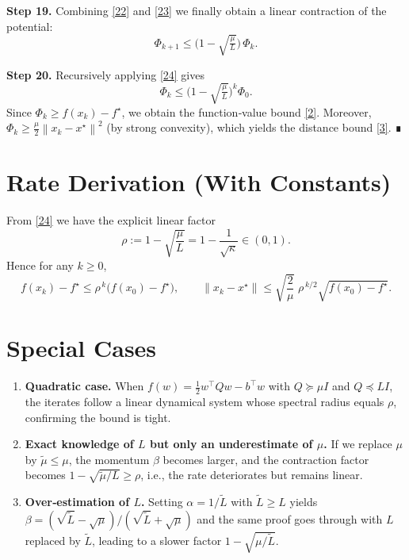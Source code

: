 \documentclass[11pt]{article}
\newcommand{\norm}[1]{\left\|#1\right\|}
\begin{document}
\noindent\textbf{Step 19.} Combining \eqref{22} and \eqref{23} we finally obtain a linear contraction of the potential:
\[
\Phi_{k+1}\le \bigl(1-\sqrt{\tfrac{\mu}{L}}\bigr)\,\Phi_k .
\tag{24}
\]

\noindent\textbf{Step 20.} Recursively applying \eqref{24} gives
\[
\Phi_k \le \bigl(1-\sqrt{\tfrac{\mu}{L}}\bigr)^{k}\Phi_0 .
\]
Since $\Phi_k\ge f(x_k)-f^\star$, we obtain the function‑value bound \eqref{2}. Moreover, $\Phi_k\ge \frac{\mu}{2}\norm{x_k-x^\star}^2$ (by strong convexity), which yields the distance bound \eqref{3}. ∎

\section*{Rate Derivation (With Constants)}
From \eqref{24} we have the explicit linear factor
\[
\rho := 1-\sqrt{\frac{\mu}{L}}
     = 1-\frac{1}{\sqrt{\kappa}} \in (0,1).
\]
Hence for any $k\ge0$,
\[
f(x_k)-f^\star \le \rho^{\,k}\bigl(f(x_0)-f^\star\bigr),\qquad
\norm{x_k-x^\star} \le \sqrt{\frac{2}{\mu}}\;\rho^{\,k/2}\sqrt{f(x_0)-f^\star}.
\]

\section*{Special Cases}
\begin{enumerate}[label=\textbf{S\arabic*.},leftmargin=*]
\item \textbf{Quadratic case.} When $f(w)=\tfrac{1}{2}w^\top Q w - b^\top w$ with $Q\succeq \mu I$ and $Q\preceq L I$, the iterates follow a linear dynamical system whose spectral radius equals $\rho$, confirming the bound is tight.
\item \textbf{Exact knowledge of $L$ but only an underestimate of $\mu$.} If we replace $\mu$ by $\tilde\mu\le\mu$, the momentum $\beta$ becomes larger, and the contraction factor becomes $1-\sqrt{\tilde\mu/L}\ge\rho$, i.e., the rate deteriorates but remains linear.
\item \textbf{Over‑estimation of $L$.} Setting $\alpha=1/\tilde L$ with $\tilde L\ge L$ yields $\beta=(\sqrt{\tilde L}-\sqrt{\mu})/(\sqrt{\tilde L}+\sqrt{\mu})$ and the same proof goes through with $L$ replaced by $\tilde L$, leading to a slower factor $1-\sqrt{\mu/\tilde L}$.
\end{enumerate}
\end{document}
